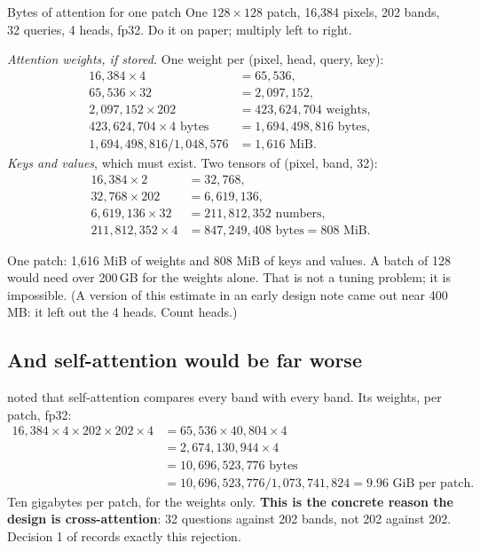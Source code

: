 \begin{worked}[label={we:crossstem:bytes}]{Bytes of attention for one patch}
One $128\times128$ patch, 16,384 pixels, 202 bands, 32 queries, 4 heads, fp32. Do it on paper; multiply left to right.

\emph{Attention weights, if stored.} One weight per (pixel, head, query, key):
\begin{align*}
  16{,}384\times4 &= 65{,}536,\\
  65{,}536\times32 &= 2{,}097{,}152,\\
  2{,}097{,}152\times202 &= 423{,}624{,}704 \text{ weights},\\
  423{,}624{,}704\times4 \text{ bytes} &= 1{,}694{,}498{,}816 \text{ bytes},\\
  1{,}694{,}498{,}816/1{,}048{,}576 &= 1{,}616 \text{ MiB}.
\end{align*}
\emph{Keys and values}, which must exist. Two tensors of (pixel, band, 32):
\begin{align*}
  16{,}384\times2 &= 32{,}768,\\
  32{,}768\times202 &= 6{,}619{,}136,\\
  6{,}619{,}136\times32 &= 211{,}812{,}352 \text{ numbers},\\
  211{,}812{,}352\times4 &= 847{,}249{,}408 \text{ bytes} = 808 \text{ MiB}.
\end{align*}
\end{worked}

One patch: 1,616 MiB of weights and 808 MiB of keys and values. A batch of 128 would need over 200\,GB for the weights alone. That is not a tuning problem; it is impossible. (A version of this estimate in an early design note came out near 400\,MB: it left out the 4 heads. Count heads.)

\subsection{And self-attention would be far worse}

 noted that self-attention compares every band with every band. Its weights, per patch, fp32:
\begin{align*}
  16{,}384\times4\times202\times202\times4 &= 65{,}536\times40{,}804\times4\\
  &= 2{,}674{,}130{,}944\times4\\
  &= 10{,}696{,}523{,}776 \text{ bytes}\\
  &= 10{,}696{,}523{,}776/1{,}073{,}741{,}824 = 9.96 \text{ GiB per patch}.
\end{align*}
Ten gigabytes per patch, for the weights only. \textbf{This is the concrete reason the design is cross-attention}: 32 questions against 202 bands, not 202 against 202. Decision 1 of  records exactly this rejection.

